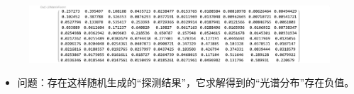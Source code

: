 \begin{frame}[c]
\begin{figure}[!htb]
        \includegraphics[width=1.\textwidth]{figures/Miniature spectrometer based on diffraction in a dispersive hole array_4.pdf} %
    \end{figure}
    \begin{itemize}
        \item 问题：存在这样随机生成的“探测结果”，它求解得到的“光谱分布”存在负值。
    \end{itemize}
\end{frame}
